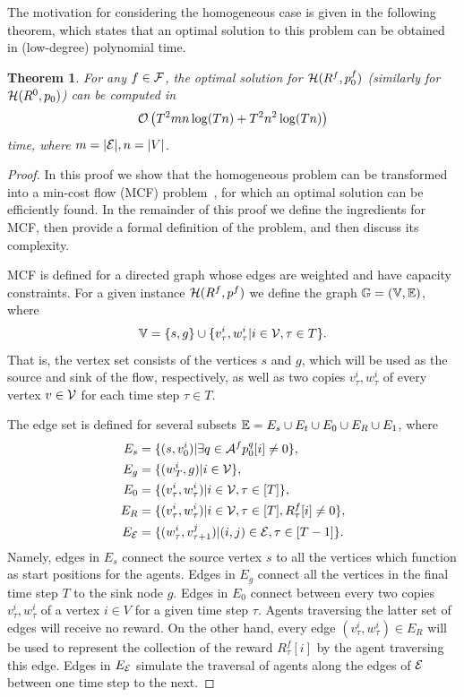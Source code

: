 \documentclass[conference]{IEEEtran}
\newtheorem{theorem}{Theorem}[section]
\begin{document}
The motivation for considering the homogeneous case is given in the following theorem, which states that an optimal solution to this problem can be obtained in (low-degree) polynomial time.

\begin{theorem}\label{thm:homogeneous}
  For any $f\in \mathcal{F}$, the optimal solution for $\mathcal{H}(R^f, p^f_0)$ (similarly for $\mathcal{H}(R^0,p_0)$) can be computed in 
  $$\mathcal{O}\left(T^2mn\log (Tn)+T^2n^2\log (Tn)\right)$$
  time, where $m=|\mathcal{E}|,n=|V|$. 
\end{theorem}
\begin{proof}
  In this proof we show that the homogeneous problem can be transformed into a min-cost flow (MCF) problem~\cite{Williamson2019}, for which an optimal solution can be efficiently found. In the remainder of this proof we define the ingredients for MCF, then provide a formal definition of the problem, and then discuss its complexity.

MCF is defined for a directed graph whose edges are weighted and have capacity constraints. For a given instance $\mathcal{H}(R^f,p^f)$ we define the graph $\mathbb{G}=(\mathbb{V},\mathbb{E})$, where
$$\mathbb{V}=\{s,g\}\cup\{v^i_\tau,w^i_\tau|i\in \mathcal{V},\tau\in T\}.$$
That is, the vertex set consists of the vertices $s$ and $g$, which will be used as the source and sink of the flow, respectively, as well as two copies $v^i_\tau,w^i_\tau$ of every vertex $v\in \mathcal{V}$ for each time step $\tau\in T$. 

The edge set is defined for several subsets $\mathbb{E}=E_{s}\cup E_t\cup E_0\cup E_{R}\cup E_1$, where
\begin{align*}
  E_s&=\{(s,v^i_0)|\exists q\in \mathcal{A}^f p^q_0[i]\neq 0\},\\
  E_g&=\{(w^i_T,g)|i\in \mathcal{V}\},\\
  E_0&=\{(v^i_\tau,w^i_\tau)|i\in \mathcal{V}, \tau\in [T]\},\\
  E_{R}&=\{(v^i_\tau,w^i_\tau)|i\in \mathcal{V}, \tau\in [T],R^f_\tau[i]\neq 0\},\\
  E_{\mathcal{E}}&=\{(w^i_\tau,v^j_{\tau+1})|(i,j)\in \mathcal{E}, \tau\in [T-1]\}.  
\end{align*}
Namely, edges in $E_s$ connect the source vertex $s$ to all the vertices which function as start positions for the agents. Edges in $E_g$ connect all the vertices in the final time step $T$ to the sink node $g$. Edges in $E_0$ connect between every two copies $v^i_\tau,w^i_\tau$ of a vertex $i\in V$ for a given time step $\tau$. Agents traversing the latter set of edges will receive no reward. On the other hand, every edge $(v^i_\tau,w^i_\tau)\in E_R$ will be used to represent the collection of the reward $R^f_\tau[i]$ by the agent traversing this edge. Edges in $E_{\mathcal{E}}$ simulate the traversal of agents along the edges of $\mathcal{E}$ between one time step to the next. 


\end{proof}
\end{document}
